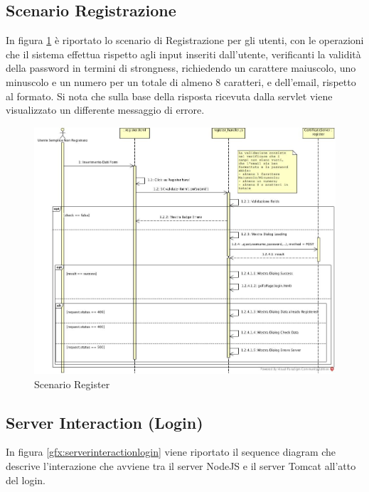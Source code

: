 \subsection{Scenario Registrazione}

In figura \ref{gfx:sdregister} è riportato lo scenario di Registrazione per gli utenti, con le operazioni che il sistema effettua rispetto agli input inseriti dall'utente, verificanti la validità della password in termini di strongness, richiedendo un carattere maiuscolo, uno minuscolo e un numero per un totale di almeno 8 caratteri, e dell'email, rispetto al formato. Si nota che sulla base della risposta ricevuta dalla servlet viene visualizzato un differente messaggio di errore.

\begin{figure}[!htbp]
	\centering
	\includegraphics[scale = .4]{img/sd_register.jpg}
	\caption{Scenario Register}
	\label{gfx:sdregister}
\end{figure}

\subsection{Server Interaction (Login)}

In figura \ref{gfx:serverinteractionlogin} viene riportato il sequence diagram che descrive l'interazione che avviene tra il server NodeJS e il server Tomcat all'atto del login.

